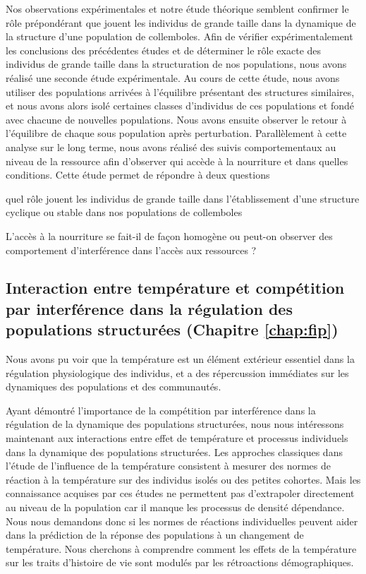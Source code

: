 Nos observations expérimentales et notre étude théorique semblent confirmer le
rôle prépondérant que jouent les individus de grande taille dans la dynamique de
la structure d'une population de collemboles. Afin de vérifier expérimentalement
les conclusions des précédentes études et de déterminer le rôle exacte des
individus de grande taille dans la structuration de nos populations, nous avons
réalisé une seconde étude expérimentale. Au cours de cette étude, nous avons
utiliser des populations arrivées à l'équilibre présentant des structures
similaires, et nous avons alors isolé certaines classes d'individus de ces
populations et fondé avec chacune de nouvelles populations. Nous avons ensuite
observer le retour à l'équilibre de chaque sous population après perturbation.
Parallèlement à cette analyse sur le long terme, nous avons réalisé des suivis
comportementaux au niveau de la ressource afin d'observer qui accède à la
nourriture et dans quelles conditions. Cette étude permet de répondre à deux
questions \begin{enumerate*}[label=(\roman*), before=\unskip{ : }, itemjoin={{ ? }},
itemjoin*={{ ? Et }}] \item quel rôle jouent les individus de grande taille dans
l'établissement d'une structure cyclique ou stable dans nos populations de
collemboles \item L'accès à la nourriture se fait-il de façon homogène ou
peut-on observer des comportement d'interférence dans l'accès aux ressources ?
\end{enumerate*}

\subsection{Interaction entre température et compétition par interférence dans
la régulation des populations structurées (Chapitre \ref{chap:fip})}

Nous avons pu voir que la température est un élément extérieur essentiel dans la
régulation physiologique des individus, et a des répercussion immédiates sur les
dynamiques des populations et des communautés. 

Ayant démontré l'importance de la compétition par interférence dans la
régulation de la dynamique des populations structurées, nous nous intéressons
maintenant aux interactions entre effet de température et processus individuels
dans la dynamique des populations structurées. Les approches classiques dans
l'étude de l'influence de la température consistent à mesurer des normes de
réaction à la température sur des individus isolés ou des petites cohortes. Mais
les connaissance acquises par ces études ne permettent pas d'extrapoler
directement au niveau de la population car il manque les processus de densité
dépendance. Nous nous demandons donc si les normes de réactions individuelles
peuvent aider dans la prédiction de la réponse des populations à un changement
de température. Nous cherchons à comprendre comment les effets de la température
sur les traits d'histoire de vie sont modulés par les rétroactions
démographiques.

